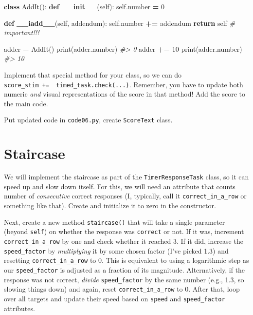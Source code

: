 \documentclass[
]{book}
\newenvironment{Shaded}{\begin{snugshade}}{\end{snugshade}}
\newcommand{\BuiltInTok}[1]{#1}
\newcommand{\CommentTok}[1]{\textcolor[rgb]{0.56,0.35,0.01}{\textit{#1}}}
\newcommand{\ControlFlowTok}[1]{\textcolor[rgb]{0.13,0.29,0.53}{\textbf{#1}}}
\newcommand{\DecValTok}[1]{\textcolor[rgb]{0.00,0.00,0.81}{#1}}
\newcommand{\FunctionTok}[1]{\textcolor[rgb]{0.13,0.29,0.53}{\textbf{#1}}}
\newcommand{\KeywordTok}[1]{\textcolor[rgb]{0.13,0.29,0.53}{\textbf{#1}}}
\newcommand{\NormalTok}[1]{#1}
\newcommand{\OperatorTok}[1]{\textcolor[rgb]{0.81,0.36,0.00}{\textbf{#1}}}
\newcommand{\VariableTok}[1]{\textcolor[rgb]{0.00,0.00,0.00}{#1}}
\begin{document}
\begin{Shaded}
\begin{Highlighting}[]
\KeywordTok{class}\NormalTok{ AddIt():}
    \KeywordTok{def} \FunctionTok{\_\_init\_\_}\NormalTok{(}\VariableTok{self}\NormalTok{):}
        \VariableTok{self}\NormalTok{.number }\OperatorTok{=} \DecValTok{0}
        
    \KeywordTok{def} \FunctionTok{\_\_iadd\_\_}\NormalTok{(}\VariableTok{self}\NormalTok{, addendum):}
        \VariableTok{self}\NormalTok{.number }\OperatorTok{+=}\NormalTok{ addendum}
        \ControlFlowTok{return} \VariableTok{self} \CommentTok{\# important!!!}


\NormalTok{adder }\OperatorTok{=}\NormalTok{ AddIt()}
\BuiltInTok{print}\NormalTok{(adder.number)}
\CommentTok{\#\textgreater{} 0}
\NormalTok{adder }\OperatorTok{+=} \DecValTok{10}
\BuiltInTok{print}\NormalTok{(adder.number)}
\CommentTok{\#\textgreater{} 10}
\end{Highlighting}
\end{Shaded}

Implement that special method for your class, so we can do \texttt{score\_stim\ +=\ \ timed\_task.check(...)}. Remember, you have to update both numeric \emph{and} visual representations of the score in that method! Add the score to the main code.

Put updated code in \texttt{code06.py}, create \texttt{ScoreText} class.

\hypertarget{staircase}{%
\section{Staircase}\label{staircase}}

We will implement the staircase as part of the \texttt{TimerResponseTask} class, so it can speed up and slow down itself. For this, we will need an attribute that counts number of \emph{consecutive} correct responses (I, typically, call it \texttt{correct\_in\_a\_row} or something like that). Create and initialize it to zero in the constructor.

Next, create a new method \texttt{staircase()} that will take a single parameter (beyond \texttt{self}) on whether the response was \texttt{correct} or not. If it was, increment \texttt{correct\_in\_a\_row} by one and check whether it reached 3. If it did, increase the \texttt{speed\_factor} by \emph{multiplying} it by some chosen factor (I've picked 1.3) and resetting \texttt{correct\_in\_a\_row} to 0. This is equivalent to using a logarithmic step as our \texttt{speed\_factor} is adjusted as a fraction of its magnitude. Alternatively, if the response was not correct, \emph{divide} \texttt{speed\_factor} by the same number (e.g., 1.3, so slowing things down) and again, reset \texttt{correct\_in\_a\_row} to 0. After that, loop over all targets and update their speed based on \texttt{speed} and \texttt{speed\_factor} attributes.
\end{document}
